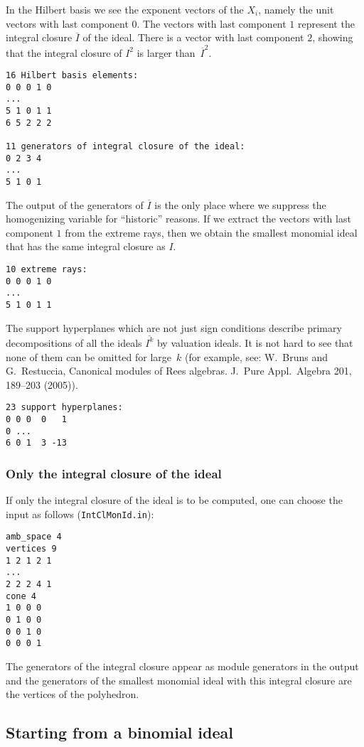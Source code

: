 \documentclass[12pt,a4paper]{scrartcl}
\theoremstyle{definition}
\begin{document}
In the Hilbert basis we see the exponent vectors of the $X_i$, namely the unit vectors with last component $0$. The vectors with last component $1$ represent the integral closure $\overline I$ of the ideal. There is a vector with last component $2$, showing that the integral closure of $I^2$ is larger than~$\overline I^2$.
\begin{Verbatim}
16 Hilbert basis elements:
0 0 0 1 0
...
5 1 0 1 1
6 5 2 2 2

11 generators of integral closure of the ideal:
0 2 3 4
...
5 1 0 1
\end{Verbatim}
The output of the generators of $\overline I$ is the only place where we suppress the homogenizing variable for ``historic'' reasons. If we extract the vectors with last component $1$ from the extreme rays, then we obtain the smallest monomial ideal that has the same integral closure as $I$.
\begin{Verbatim}
10 extreme rays:
0 0 0 1 0
...
5 1 0 1 1
\end{Verbatim}
The support hyperplanes which are not just sign conditions describe primary decompositions of all the ideals $\overline{I^k}$ by valuation ideals. It is not hard to see that none of them can be omitted for large~$k$ (for example, see: W.~Bruns and G.~Restuccia, Canonical modules of Rees algebras. J.\ Pure Appl.\ Algebra 201, 189--203 (2005)).
\begin{Verbatim}
23 support hyperplanes:
0 0 0  0   1
0 ...
6 0 1  3 -13
\end{Verbatim}

\subsubsection{Only the integral closure of the ideal}

If only the integral closure of the ideal is to be computed, one can choose the input as follows (\verb|IntClMonId.in|):
\begin{Verbatim}
amb_space 4
vertices 9
1 2 1 2 1
...
2 2 2 4 1
cone 4
1 0 0 0
0 1 0 0
0 0 1 0
0 0 0 1
\end{Verbatim}

The generators of the integral closure appear as module generators in the output and the generators of the smallest monomial ideal with this integral closure are the vertices of the polyhedron.

\subsection{Starting from a binomial ideal}\label{binom_ex}
\end{document}
